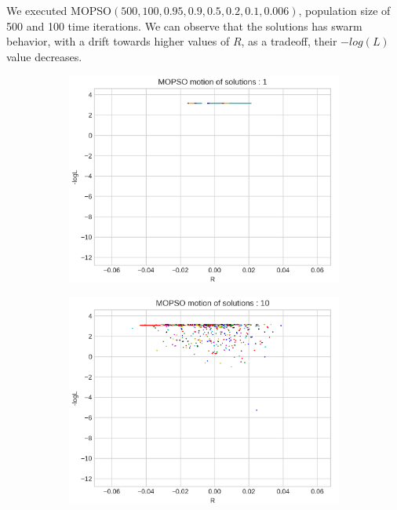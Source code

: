 We executed MOPSO$(500,100,0.95,0.9,0.5,0.2,0.1,0.006)$, population size of 500 and 100 time iterations. We can observe that the solutions has swarm behavior, with a drift towards higher values of $R$, as a tradeoff, their $-log(L)$ value decreases.
\begin{figure}[H]
  \centering
  \begin{minipage}[b]{0.22\textwidth}
  \begin{figure}[H]
      \centering
      \includegraphics[width=\textwidth]{images/1-fix_axisMOPSO motion of solutions _ 1-R - logL-gard.png}
  \end{figure}
  \end{minipage}
  \hspace{0.0cm}
  \begin{minipage}[b]{0.22\textwidth}
  \begin{figure}[H]
      \centering
      \includegraphics[width=\textwidth]{images/1-fix_axisMOPSO motion of solutions _ 10-R - logL-gard.png}

\end{figure}
\end{minipage}
\end{figure}

